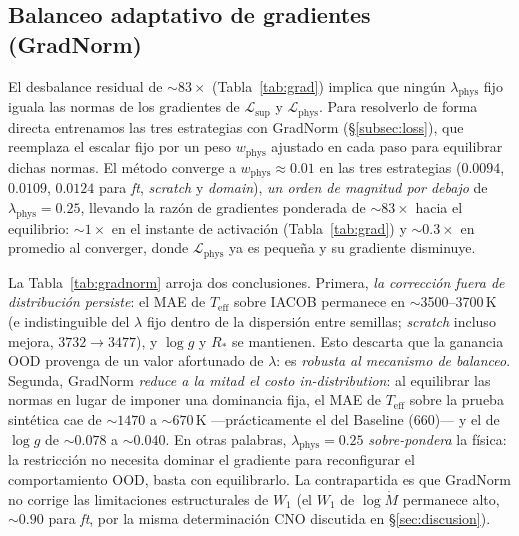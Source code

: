 \documentclass[sigconf,ACM]{acmart}
\begin{document}
\subsection{Balanceo adaptativo de gradientes (GradNorm)}
\label{subsec:gradnorm}

El desbalance residual de ${\sim}83\times$ (Tabla~\ref{tab:grad}) implica que ningún
$\lambda_\mathrm{phys}$ fijo iguala las normas de los gradientes de
$\mathcal{L}_\mathrm{sup}$ y $\mathcal{L}_\mathrm{phys}$. Para resolverlo de forma
directa entrenamos las tres estrategias con GradNorm (§\ref{subsec:loss}), que
reemplaza el escalar fijo por un peso $w_\mathrm{phys}$ ajustado en cada paso para
equilibrar dichas normas. El método converge a $w_\mathrm{phys}\approx 0.01$ en las
tres estrategias ($0.0094$, $0.0109$, $0.0124$ para \emph{ft}, \emph{scratch} y
\emph{domain}), \emph{un orden de magnitud por debajo} de $\lambda_\mathrm{phys}=0.25$,
llevando la razón de gradientes ponderada de ${\sim}83\times$ hacia el equilibrio: ${\sim}1\times$ en el instante de activación (Tabla~\ref{tab:grad}) y ${\sim}0.3\times$ en promedio al converger, donde $\mathcal{L}_\mathrm{phys}$ ya es pequeña y su gradiente disminuye.

La Tabla~\ref{tab:gradnorm} arroja dos conclusiones. Primera, \emph{la corrección
fuera de distribución persiste}: el MAE de $T_\mathrm{eff}$ sobre IACOB permanece en
$\sim$3500--3700\,K (e indistinguible del $\lambda$ fijo dentro de la dispersión
entre semillas; \emph{scratch} incluso mejora, $3732\to3477$), y $\log g$ y $R_*$ se
mantienen. Esto descarta que la ganancia OOD provenga de un valor afortunado de
$\lambda$: es \emph{robusta al mecanismo de balanceo}. Segunda, GradNorm
\emph{reduce a la mitad el costo in-distribution}: al equilibrar las normas en lugar
de imponer una dominancia fija, el MAE de $T_\mathrm{eff}$ sobre la prueba sintética
cae de ${\sim}1470$ a ${\sim}670$\,K ---prácticamente el del Baseline ($660$)--- y el
de $\log g$ de ${\sim}0.078$ a ${\sim}0.040$. En otras palabras, $\lambda_\mathrm{phys}=0.25$
\emph{sobre-pondera} la física: la restricción no necesita dominar el gradiente para
reconfigurar el comportamiento OOD, basta con equilibrarlo. La contrapartida es que
GradNorm no corrige las limitaciones estructurales de $W_1$ (el $W_1$ de
$\log\dot{M}$ permanece alto, ${\sim}0.90$ para \emph{ft}, por la misma
determinación CNO discutida en §\ref{sec:discusion}).
\end{document}
